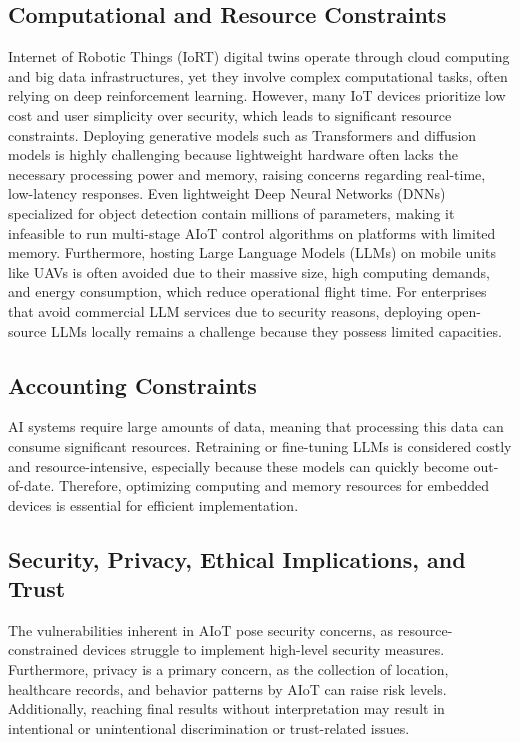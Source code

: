 \documentclass[journal]{IEEEtran}
\begin{document}
\subsection{Computational and Resource Constraints}
Internet of Robotic Things (IoRT) digital twins operate through cloud computing and big data infrastructures, yet they involve complex computational tasks, often relying on deep reinforcement learning. However, many IoT devices prioritize low cost and user simplicity over security, which leads to significant resource constraints. Deploying generative models such as Transformers and diffusion models is highly challenging because lightweight hardware often lacks the necessary processing power and memory, raising concerns regarding real-time, low-latency responses. Even lightweight Deep Neural Networks (DNNs) specialized for object detection contain millions of parameters, making it infeasible to run multi-stage AIoT control algorithms on platforms with limited memory. Furthermore, hosting Large Language Models (LLMs) on mobile units like UAVs is often avoided due to their massive size, high computing demands, and energy consumption, which reduce operational flight time. For enterprises that avoid commercial LLM services due to security reasons, deploying open-source LLMs locally remains a challenge because they possess limited capacities.

\subsection{Accounting Constraints}
AI systems require large amounts of data, meaning that processing this data can consume significant resources. Retraining or fine-tuning LLMs is considered costly and resource-intensive, especially because these models can quickly become out-of-date. Therefore, optimizing computing and memory resources for embedded devices is essential for efficient implementation.

\subsection{Security, Privacy, Ethical Implications, and Trust}
The vulnerabilities inherent in AIoT pose security concerns, as resource-constrained devices struggle to implement high-level security measures. Furthermore, privacy is a primary concern, as the collection of location, healthcare records, and behavior patterns by AIoT can raise risk levels. Additionally, reaching final results without interpretation may result in intentional or unintentional discrimination or trust-related issues.
\end{document}
